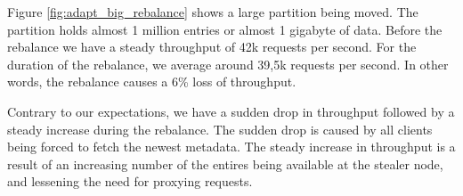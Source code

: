 Figure \ref{fig:adapt_big_rebalance} shows a large partition being moved. The partition holds almost 1 million entries or almost 1 gigabyte of data. Before the rebalance we have a steady throughput of 42k requests per second. For the duration of the rebalance, we average around 39,5k requests per second. In other words, the rebalance causes a 6\% loss of throughput. 

Contrary to our expectations, we have a sudden drop in throughput followed by a steady increase during the rebalance. The sudden drop is caused by all clients being forced to fetch the newest metadata. The steady increase in throughput is a result of an increasing number of the entires being available at the stealer node, and lessening the need for proxying requests.


